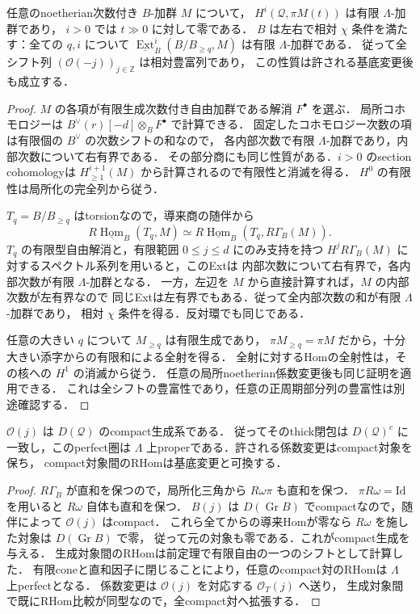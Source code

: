 \begin{proposition}\label{prop:finite-full-shift-ample}
任意のnoetherian次数付き $B$-加群 $M$ について，
$H^i(\mathcal Q,\pi M(t))$ は有限 $\Lambda$-加群であり，
$i>0$ では $t\gg0$ に対して零である．
$B$ は左右で相対 $\chi$ 条件を満たす：全ての $q,i$ について
$\underline{\operatorname{Ext}}^i_B(B/B_{\ge q},M)$ は有限 $\Lambda$-加群である．
従って全シフト列 $(\mathcal O(-j))_{j\in\mathbb Z}$ は相対豊富列であり，
この性質は許される基底変更後も成立する．
\end{proposition}
\begin{proof}
$M$ の各項が有限生成次数付き自由加群である解消 $F^\bullet$ を選ぶ．
局所コホモロジーは $B^\vee(r)[-d]\otimes_BF^\bullet$ で計算できる．
固定したコホモロジー次数の項は有限個の $B^\vee$ の次数シフトの和なので，
各内部次数で有限 $\Lambda$-加群であり，内部次数について右有界である．
その部分商にも同じ性質がある．$i>0$ のsection cohomologyは
$H^{i+1}_{\ge1}(M)$ から計算されるので有限性と消滅を得る．
$H^0$ の有限性は局所化の完全列から従う．

$T_q=B/B_{\ge q}$ はtorsionなので，導来商の随伴から
\[
 R\!\underline{\operatorname{Hom}}_B(T_q,M)
 \simeq R\!\underline{\operatorname{Hom}}_B(T_q,R\Gamma_B(M)).
\]
$T_q$ の有限型自由解消と，有限範囲 $0\le j\le d$ にのみ支持を持つ
$H^jR\Gamma_B(M)$ に対するスペクトル系列を用いると，このExtは
内部次数について右有界で，各内部次数が有限 $\Lambda$-加群となる．
一方，左辺を $M$ から直接計算すれば，$M$ の内部次数が左有界なので
同じExtは左有界でもある．従って全内部次数の和が有限 $\Lambda$-加群であり，
相対 $\chi$ 条件を得る．反対環でも同じである．

任意の大きい $q$ について $M_{\ge q}$ は有限生成であり，
$\pi M_{\ge q}=\pi M$ だから，十分大きい添字からの有限和による全射を得る．
全射に対するHomの全射性は，その核への $H^1$ の消滅から従う．
任意の局所noetherian係数変更後も同じ証明を適用できる．
これは全シフトの豊富性であり，任意の正周期部分列の豊富性は別途確認する．
\end{proof}

\begin{proposition}\label{prop:finite-tails-compact-proper}
$\mathcal O(j)$ は $D(\mathcal Q)$ のcompact生成系である．
従ってそのthick閉包は $D(\mathcal Q)^c$ に一致し，このperfect圏は
$\Lambda$ 上properである．許される係数変更はcompact対象を保ち，
compact対象間のRHomは基底変更と可換する．
\end{proposition}
\begin{proof}
$R\Gamma_B$ が直和を保つので，局所化三角から $R\omega\pi$ も直和を保つ．
$\pi R\omega=\mathrm{Id}$ を用いると $R\omega$ 自体も直和を保つ．
$B(j)$ は $D(\operatorname{Gr}B)$ でcompactなので，随伴によって $\mathcal O(j)$ はcompact．
これら全てからの導来Homが零なら $R\omega$ を施した対象は $D(\operatorname{Gr}B)$ で零，
従って元の対象も零である．これがcompact生成を与える．
生成対象間のRHomは前定理で有限自由の一つのシフトとして計算した．
有限coneと直和因子に閉じることにより，任意のcompact対のRHomは $\Lambda$ 上perfectとなる．
係数変更は $\mathcal O(j)$ を対応する $\mathcal O_T(j)$ へ送り，
生成対象間で既にRHom比較が同型なので，全compact対へ拡張する．
\end{proof}

